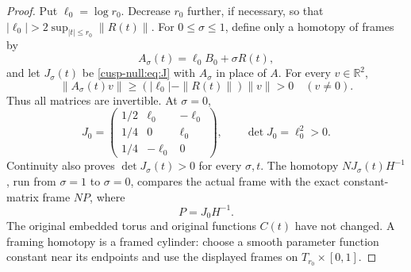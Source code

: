 \begin{proof}
Put \(\ell_0=\log r_0\). Decrease \(r_0\) further, if necessary, so
that \(|\ell_0|>2\sup_{|t|\leq r_0}\|R(t)\|\). For
\(0\leq\sigma\leq1\), define only a homotopy of frames by
\[
 A_\sigma(t)=\ell_0B_0+\sigma R(t),
\]
and let \(J_\sigma(t)\) be \eqref{cusp-null:eq:J} with \(A_\sigma\) in place
of \(A\). For every \(v\in\mathbb R^2\),
\[
 \|A_\sigma(t)v\|\geq
 (|\ell_0|-\|R(t)\|)\|v\|>0\quad(v\ne0).
\]
Thus all matrices are invertible. At \(\sigma=0\),
\begin{equation}
 J_0=
 \begin{pmatrix}
 1/2&\ell_0&-\ell_0\\
 1/4&0&\ell_0\\
 1/4&-\ell_0&0
 \end{pmatrix},\qquad \det J_0=\ell_0^2>0.
 \label{cusp-null:eq:J0}
\end{equation}
Continuity also proves \(\det J_\sigma(t)>0\) for every \(\sigma,t\).
The homotopy \(N J_\sigma(t)H^{-1}\), run from \(\sigma=1\) to
\(\sigma=0\), compares the actual frame with the exact constant-matrix
frame \(N P\), where
\begin{equation}
 P=J_0H^{-1}.
 \label{cusp-null:eq:P}
\end{equation}
The original embedded torus and original functions \(C(t)\) have not
changed. A framing homotopy is a framed cylinder: choose a smooth
parameter function constant near its endpoints and use the displayed
frames on \(T_{r_0}\times[0,1]\).


\end{proof}
